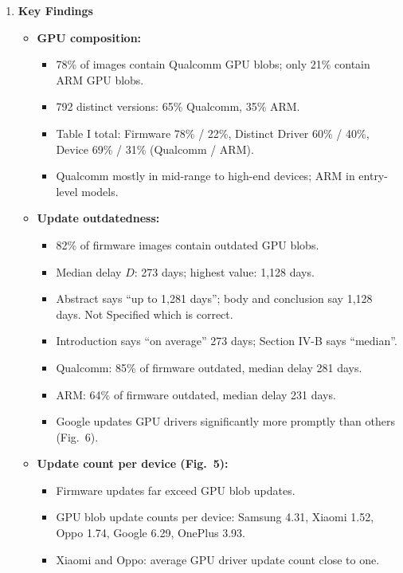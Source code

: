 \documentclass[11pt,a4paper]{article}
\newcommand{\entrypart}[1]{\textbf{\color{accent}#1}\par\vspace{2pt}}
\begin{document}
\begin{enumerate}
    \item \entrypart{Key Findings}
    \begin{itemize}[leftmargin=*, itemsep=1pt, topsep=2pt]
        \item \textbf{GPU composition:}
        \begin{itemize}[itemsep=0pt]
            \item 78\% of images contain Qualcomm GPU blobs; only 21\% contain ARM GPU blobs.
            \item 792 distinct versions: 65\% Qualcomm, 35\% ARM.
            \item Table I total: Firmware 78\% / 22\%, Distinct Driver 60\% / 40\%, Device 69\% / 31\% (Qualcomm / ARM).
            \item Qualcomm mostly in mid-range to high-end devices; ARM in entry-level models.
        \end{itemize}
        \item \textbf{Update outdatedness:}
        \begin{itemize}[itemsep=0pt]
            \item 82\% of firmware images contain outdated GPU blobs.
            \item Median delay $D$: 273 days; highest value: 1,128 days.
            \item Abstract says ``up to 1,281 days''; body and conclusion say 1,128 days. Not Specified which is correct.
            \item Introduction says ``on average'' 273 days; Section IV-B says ``median''.
            \item Qualcomm: 85\% of firmware outdated, median delay 281 days.
            \item ARM: 64\% of firmware outdated, median delay 231 days.
            \item Google updates GPU drivers significantly more promptly than others (Fig.\ 6).
        \end{itemize}
        \item \textbf{Update count per device (Fig.\ 5):}
        \begin{itemize}[itemsep=0pt]
            \item Firmware updates far exceed GPU blob updates.
            \item GPU blob update counts per device: Samsung 4.31, Xiaomi 1.52, Oppo 1.74, Google 6.29, OnePlus 3.93.
            \item Xiaomi and Oppo: average GPU driver update count close to one.
        \end{itemize}

\end{itemize}
\end{enumerate}
\end{document}
